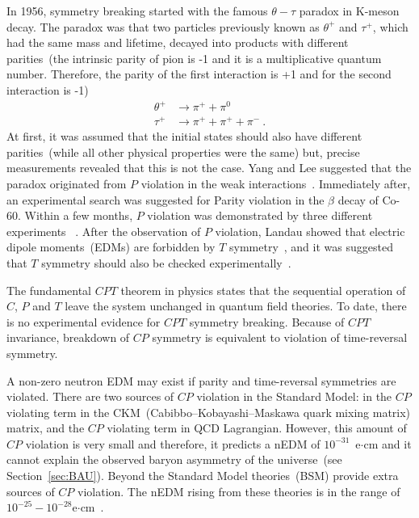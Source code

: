 In 1956, symmetry breaking started with the famous $\theta-\tau$
paradox in K-meson decay. The paradox was that two particles
previously known as $\theta^+$ and $\tau^+$, which had the same mass
and lifetime, decayed into products with different parities~(the
intrinsic parity of pion is -1 and it is a multiplicative quantum
number. Therefore, the parity of the first interaction is +1 and for
the second interaction is -1)
\begin{equation}
  \begin{split}
    \theta^+ &\rightarrow \pi^+ + \pi^0 \\
    \tau^+ &\rightarrow \pi^+ + \pi^+ + \pi^-~.
  \end{split}
\end{equation}
At first, it was assumed that the initial states should also have
different parities~(while all other physical properties were the same)
but, precise measurements revealed that this is not the case. Yang and
Lee suggested that the paradox originated from $P$ violation in the
weak interactions~\cite{lee1957parity}. Immediately after, an
experimental search was suggested for Parity violation in the $\beta$
decay of Co-60. Within a few months, $P$ violation was demonstrated by
three different experiments
~\cite{PhysRev.105.1413,PhysRev.105.1415,friedman1957nuclear}. After
the observation of $P$ violation, Landau showed that electric dipole
moments~(EDMs) are forbidden by $T$
symmetry~\cite{landau1957conservation}, and it was suggested that $T$
symmetry should also be checked experimentally~\cite{PhysRev.106.517}.

The fundamental $CPT$ theorem in physics states that the sequential
operation of $C$, $P$ and $T$ leave the system unchanged in quantum
field theories. To date, there is no experimental evidence for $CPT$
symmetry breaking. Because of $CPT$ invariance, breakdown of $CP$
symmetry is equivalent to violation of time-reversal symmetry.




A non-zero neutron EDM may exist if parity and time-reversal
symmetries are violated. There are two sources of $CP$ violation in
the Standard Model: in the $CP$ violating term in the
CKM~(Cabibbo–Kobayashi–Maskawa quark mixing matrix) matrix, and the
$CP$ violating term in QCD Lagrangian. However, this amount of $CP$
violation is very small and therefore, it predicts a nEDM of
$10^{-31}$~e$\cdot$cm and it cannot explain the observed baryon
asymmetry of the universe~(see Section~\ref{sec:BAU}). Beyond the
Standard Model theories~(BSM) provide extra sources of $CP$
violation. The nEDM rising from these theories is in the range of
$10^{-25}-10^{-28}$e$\cdot$cm~\cite{pospelov2005electric}.



